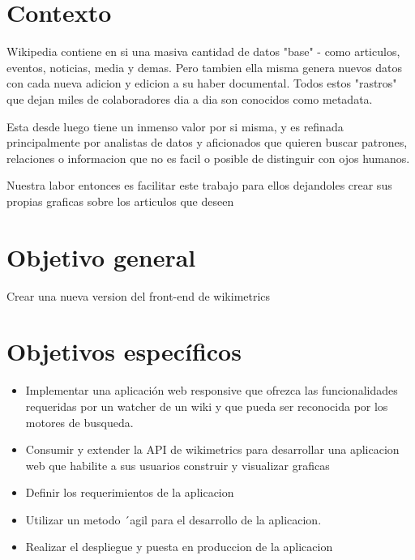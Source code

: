 
\section{Contexto}



Wikipedia contiene en si una masiva cantidad de datos "base" - como articulos, eventos, noticias, media y demas. Pero tambien ella misma genera nuevos datos con cada nueva adicion y edicion a su haber documental. Todos estos "rastros" que dejan miles de colaboradores dia a dia son conocidos como metadata.

Esta desde luego tiene un inmenso valor por si misma, y es refinada principalmente por analistas de datos y aficionados que quieren buscar patrones, relaciones o informacion que no es facil o posible de distinguir con ojos humanos.






Nuestra labor entonces es facilitar este trabajo para ellos dejandoles crear sus propias graficas sobre los articulos que deseen

\section{Objetivo general}
Crear una nueva version del front-end de wikimetrics


\section{Objetivos específicos}

\begin{itemize}{}{}

    \item Implementar una aplicación web responsive que ofrezca las funcionalidades requeridas por un watcher de un wiki y que pueda ser reconocida por los motores de busqueda.

    \item Consumir y extender la API de wikimetrics para desarrollar una aplicacion web que habilite a sus usuarios construir y visualizar graficas
    
    \item Definir los requerimientos de la aplicacion
    \item Utilizar un metodo ´agil para el desarrollo de la aplicacion.
    \item Realizar el despliegue y puesta en produccion de la aplicacion
    
\end{itemize}



